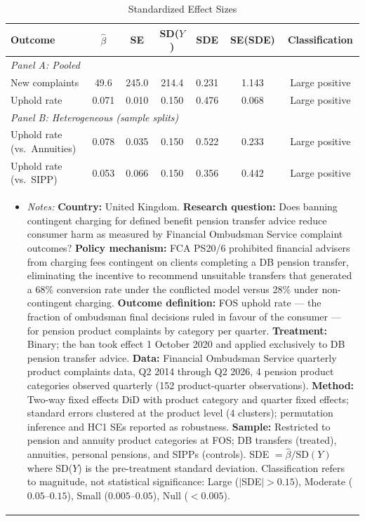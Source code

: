 \begin{table}[t]
\centering
\caption{Standardized Effect Sizes}
\label{tab:sde}
\begin{tabular}{lcccccc}
\hline\hline
Outcome & $\hat{\beta}$ & SE & SD($Y$) & SDE & SE(SDE) & Classification \\
\hline
\multicolumn{7}{l}{\textit{Panel A: Pooled}} \\
New complaints & 49.6 & 245.0 & 214.4 & 0.231 & 1.143 & Large positive \\
Uphold rate & 0.071 & 0.010 & 0.150 & 0.476 & 0.068 & Large positive \\
\hline
\multicolumn{7}{l}{\textit{Panel B: Heterogeneous (sample splits)}} \\
Uphold rate (vs.\ Annuities) & 0.078 & 0.035 & 0.150 & 0.522 & 0.233 & Large positive \\
Uphold rate (vs.\ SIPP) & 0.053 & 0.066 & 0.150 & 0.356 & 0.442 & Large positive \\
\hline\hline
\multicolumn{7}{p{0.95\textwidth}}{\footnotesize \begin{itemize}[leftmargin=*,nosep] \item \textit{Notes:} \textbf{Country:} United Kingdom. \textbf{Research question:} Does banning contingent charging for defined benefit pension transfer advice reduce consumer harm as measured by Financial Ombudsman Service complaint outcomes? \textbf{Policy mechanism:} FCA PS20/6 prohibited financial advisers from charging fees contingent on clients completing a DB pension transfer, eliminating the incentive to recommend unsuitable transfers that generated a 68\% conversion rate under the conflicted model versus 28\% under non-contingent charging. \textbf{Outcome definition:} FOS uphold rate --- the fraction of ombudsman final decisions ruled in favour of the consumer --- for pension product complaints by category per quarter. \textbf{Treatment:} Binary; the ban took effect 1 October 2020 and applied exclusively to DB pension transfer advice. \textbf{Data:} Financial Ombudsman Service quarterly product complaints data, Q2 2014 through Q2 2026, 4 pension product categories observed quarterly (152 product-quarter observations). \textbf{Method:} Two-way fixed effects DiD with product category and quarter fixed effects; standard errors clustered at the product level (4 clusters); permutation inference and HC1 SEs reported as robustness. \textbf{Sample:} Restricted to pension and annuity product categories at FOS; DB transfers (treated), annuities, personal pensions, and SIPPs (controls). SDE $= \hat{\beta} / \text{SD}(Y)$ where SD($Y$) is the pre-treatment standard deviation. Classification refers to magnitude, not statistical significance: Large ($|$SDE$| > 0.15$), Moderate ($0.05$--$0.15$), Small ($0.005$--$0.05$), Null ($< 0.005$). \end{itemize}}
\end{tabular}
\end{table}
